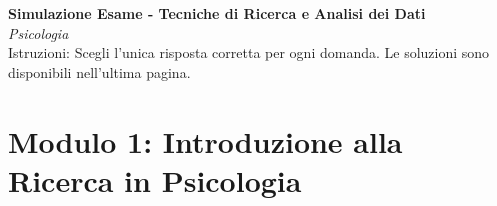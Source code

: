 \documentclass[12pt, a4paper]{article}
\begin{document}
\begin{center}
    \Large\textbf{Simulazione Esame - Tecniche di Ricerca e Analisi dei Dati} \\
    \vspace{0.2cm}
    \large\textit{Psicologia} \\
    \vspace{0.5cm}
    \normalsize{Istruzioni: Scegli l'unica risposta corretta per ogni domanda. Le soluzioni sono disponibili nell'ultima pagina.}
\end{center}
\vspace{1cm}

\section*{Modulo 1: Introduzione alla Ricerca in Psicologia}
\end{document}
